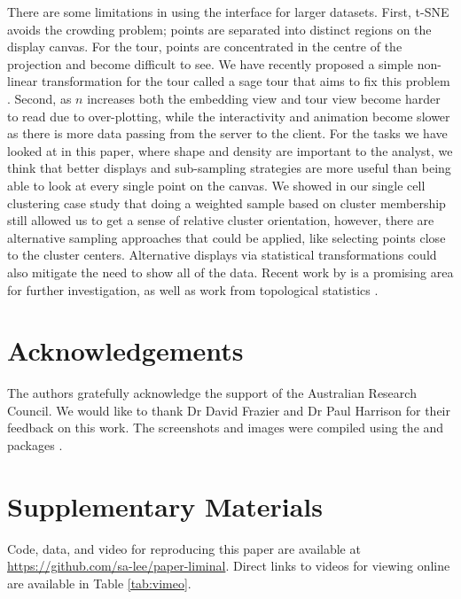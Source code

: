 \documentclass[article,notitle]{jdssv}
\begin{document}
There are some limitations
in using the  interface for larger datasets. First,
t-SNE avoids the crowding problem; points are separated into distinct regions
on the display canvas. For the tour, points are concentrated in the
centre of the projection and become difficult to see. We have recently proposed a simple non-linear transformation for the tour called a sage tour that aims to fix this problem \citep{Laa2020-vk}.
Second, as \(n\) increases both the embedding view and tour view become harder to read due to over-plotting, while the interactivity and animation become slower as there is more data passing from the server to the client.
For the tasks we have looked at in this paper, where shape and density are important to the analyst, we think that better displays and sub-sampling strategies are more useful than being able to look at every single point on the canvas. We showed in our single cell clustering case study that doing a weighted sample based on cluster membership still allowed us to get a sense of relative cluster orientation, however, there are alternative sampling approaches that could be applied, like selecting points close to the cluster centers. Alternative displays via statistical transformations could also mitigate the need to show all of the data. Recent work
by \citet{Laa2020-wr} is a promising area for further investigation, as well as
work from topological statistics \citep{Rieck2017-kk, Genovese2017-iq}.

\newpage

\hypertarget{acknowledgements}{%
\section*{Acknowledgements}\label{acknowledgements}}

The authors gratefully acknowledge the support of the Australian Research Council.
We would like to thank Dr David Frazier and Dr Paul Harrison for
their feedback on this work. The screenshots and images were compiled using the
 and  packages \citep{r-cowplot, Wickham2016-gz}.

\hypertarget{supplementary-materials}{%
\section*{Supplementary Materials}\label{supplementary-materials}}

Code, data, and video for reproducing this paper are available at \url{https://github.com/sa-lee/paper-liminal}. Direct links to videos for viewing
online are available in Table \ref{tab:vimeo}.
\end{document}
